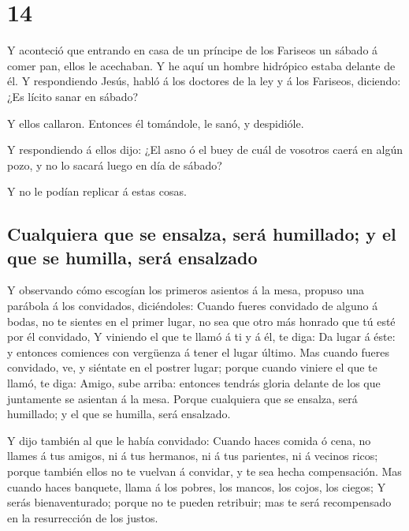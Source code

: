 \hypertarget{section-42-14}{%
\section{14}\label{section-42-14}}

 Y aconteció que entrando en casa de un príncipe de los
Fariseos un sábado á comer pan, ellos le acechaban.  Y he
aquí un hombre hidrópico estaba delante de él.  Y
respondiendo Jesús, habló á los doctores de la ley y á los Fariseos,
diciendo: ¿Es lícito sanar en sábado?

 Y ellos callaron. Entonces él tomándole, le sanó, y
despidióle.

 Y respondiendo á ellos dijo: ¿El asno ó el buey de cuál
de vosotros caerá en algún pozo, y no lo sacará luego en día de sábado?

 Y no le podían replicar á estas cosas.

\hypertarget{cualquiera-que-se-ensalza-seruxe1-humillado-y-el-que-se-humilla-seruxe1-ensalzado}{%
\subsection{Cualquiera que se ensalza, será humillado; y el que se
humilla, será
ensalzado}\label{cualquiera-que-se-ensalza-seruxe1-humillado-y-el-que-se-humilla-seruxe1-ensalzado}}

 Y observando cómo escogían los primeros asientos á la
mesa, propuso una parábola á los convidados, diciéndoles: 
Cuando fueres convidado de alguno á bodas, no te sientes en el primer
lugar, no sea que otro más honrado que tú esté por él convidado,
 Y viniendo el que te llamó á ti y á él, te diga: Da lugar
á éste: y entonces comiences con vergüenza á tener el lugar último.
 Mas cuando fueres convidado, ve, y siéntate en el
postrer lugar; porque cuando viniere el que te llamó, te diga: Amigo,
sube arriba: entonces tendrás gloria delante de los que juntamente se
asientan á la mesa.  Porque cualquiera que se ensalza,
será humillado; y el que se humilla, será ensalzado.

 Y dijo también al que le había convidado: Cuando haces
comida ó cena, no llames á tus amigos, ni á tus hermanos, ni á tus
parientes, ni á vecinos ricos; porque también ellos no te vuelvan á
convidar, y te sea hecha compensación.  Mas cuando haces
banquete, llama á los pobres, los mancos, los cojos, los ciegos;
 Y serás bienaventurado; porque no te pueden retribuir;
mas te será recompensado en la resurrección de los justos.

